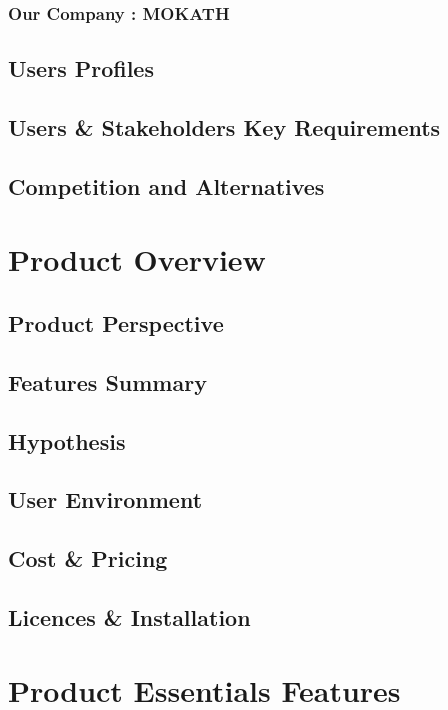 \documentclass[12pt,a4paper,oneside, titlepage]{article}
\begin{document}
	    \subsubsection{Our Company : MOKATH}
	    
	\subsection{Users Profiles}
	\subsection{Users \& Stakeholders Key Requirements}
	\subsection{Competition and Alternatives}
	
    \newpage
	\section{Product Overview}
	\subsection{Product Perspective}
	\subsection{Features Summary}
	\subsection{Hypothesis}
	\subsection{User Environment}
	\subsection{Cost \& Pricing}
	\subsection{Licences \& Installation}
	
    \newpage
	\section{Product Essentials Features}
\end{document}
